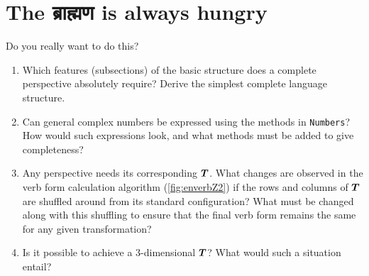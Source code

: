\part[Practice Exercises]{The \textsanskrit{ब्राह्मण} is always hungry} \label{part:enprac}
Do you really want to do this?
\begin{enumerate}
    \item Which features (subsections) of the basic structure does a complete perspective absolutely require? Derive the simplest complete language structure.
    \item Can general complex numbers be expressed using the methods in \texttt{Numbers}? How would such expressions look, and what methods must be added to give completeness?
    \item Any perspective needs its corresponding $\boldsymbol{T}$. What changes are observed in the verb form calculation algorithm (\autoref{fig:enverbZ2}) if the rows and columns of $\boldsymbol{T}$ are shuffled around from its standard configuration? What must be changed along with this shuffling to ensure that the final verb form remains the same for any given transformation?
    \item Is it possible to achieve a 3-dimensional $\boldsymbol{T}$? What would such a situation entail?
\end{enumerate}